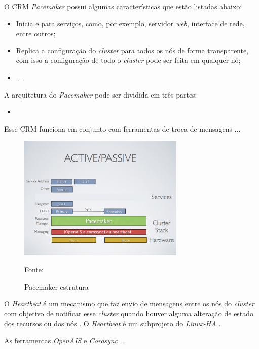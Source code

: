 O \ac{CRM} \textit{Pacemaker} possui algumas características que estão listadas abaixo:
\begin{itemize}
 \item Inicia e para serviços, como, por exemplo, servidor \textit{web}, interface de rede, entre outros;
 \item Replica a configuração do \textit{cluster} para todos os nós de forma transparente, com isso a configuração de todo o \textit{cluster} 
 pode ser feita em qualquer nó;
 \item ...
\end{itemize}

A arquitetura do \textit{Pacemaker} pode ser dividida em três partes:
\begin{itemize}
 \item 
\end{itemize}

Esse \ac{CRM} funciona em conjunto com ferramentas de troca de mensagens ...

\begin{figure}[h!]
 \centering
 \includegraphics[width=300px]{img/pacemaker_tools.eps}
 \caption{Pacemaker estrutura}
 Fonte: \citet{pacemaker}
 \label{fig:pacemaker_tools}
\end{figure}

O \textit{Heartbeat} é um mecanismo que faz envio de mensagens entre os nós do \textit{cluster} com objetivo de notificar esse 
\textit{cluster} quando houver alguma alteração de estado dos recursos ou dos nós \cite{clusterlabs}. O \textit{Heartbeat} é um subprojeto do
\textit{Linux-HA} \cite{linuxha}.

As ferramentas \textit{OpenAIS} e \textit{Corosync} ...

